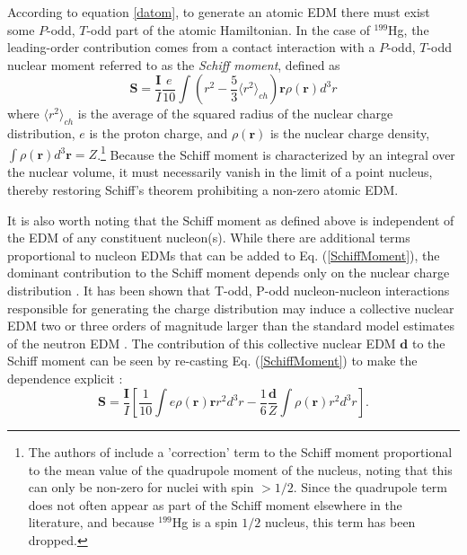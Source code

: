 \documentclass [10pt, twoside] {uwthesis}[2012/04/02]
\begin{document}
According to equation \eqref{datom}, to generate an atomic EDM there must exist some $P$-odd, $T$-odd part of the atomic Hamiltonian. In the case of $^{199}$Hg, the leading-order contribution comes from a contact interaction with a $P$-odd, $T$-odd nuclear moment referred to as the \textit{Schiff moment}, defined as \cite{2008_Schiff_Theorem_Rederivation}
\begin{equation}\label{SchiffMoment} 
\mathbf{S} = \dfrac{\mathbf{I}}{I} \dfrac{e}{10} \int \left( r^2 - \dfrac{5}{3} \langle r^2\rangle_{ch} \right) \mathbf{r} \rho(\mathbf{r})d^3r  \end{equation}
where $\langle r^2 \rangle_{ch}$ is the average of the squared radius of the nuclear charge distribution, $e$ is the proton charge, and $\rho(\mathbf{r})$ is the nuclear charge density, $\int \rho(\mathbf{r}) d^3\mathbf{r} = Z$.\footnote{The authors of \cite{2008_Schiff_Theorem_Rederivation} include a 'correction' term to the Schiff moment proportional to the mean value of the quadrupole moment of the nucleus, noting that this can only be non-zero for nuclei with spin $> 1/2$. Since the quadrupole term does not often appear as part of the Schiff moment elsewhere in the literature, and because $^{199}$Hg is a spin $1/2$ nucleus, this term has been dropped.} Because the Schiff moment is characterized by an integral over the nuclear volume, it must necessarily vanish in the limit of a point nucleus, thereby restoring Schiff's theorem prohibiting a non-zero atomic EDM.

It is also worth noting that the Schiff moment as defined above is independent of the EDM of any constituent nucleon(s). While there are additional terms proportional to nucleon EDMs that can be added to Eq. (\ref{SchiffMoment}), the dominant contribution to the Schiff moment depends only on the nuclear charge distribution \cite[Sec. 4.2]{2013_Engel_et_al_EDM_review}. It has been shown that T-odd, P-odd nucleon-nucleon interactions responsible for generating the charge distribution may induce a collective nuclear EDM two or three orders of magnitude larger than the standard model estimates of the neutron EDM \cite{1984_Sushkov_et._al._P_T_odd_atomic_experiments}. The contribution of this collective nuclear EDM $\mathbf{d}$ to the Schiff moment can be seen by re-casting Eq. (\ref{SchiffMoment}) to make the dependence explicit \cite{2004_Ginges_Flambaum_Fund._Symmetries_in_Atoms}:
\begin{equation}\label{dSchiffMoment} \mathbf{S} = \dfrac{\mathbf{I}}{I} \left[ \dfrac{1}{10}\int e\rho(\mathbf{r})\mathbf{r}r^2d^3r - \dfrac{1}{6}\dfrac{\mathbf{d}}{Z}\int \rho(\mathbf{r})r^2d^3r \right]. \end{equation}
\end{document}
